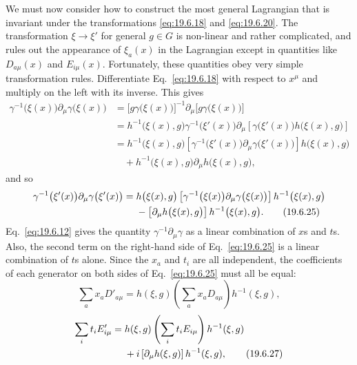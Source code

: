 We must now consider how to construct the most general Lagrangian that is invariant under the transformations \eqref{eq:19.6.18} and \eqref{eq:19.6.20}. The transformation $\xi\to\xi'$ for general $g\in G$ is non-linear and rather complicated, and rules out the appearance of $\xi_a(x)$ in the Lagrangian except in quantities like $D_{a\mu}(x)$ and $E_{i\mu}(x)$. Fortunately, these quantities obey very simple transformation rules. Differentiate Eq.~\eqref{eq:19.6.18} with respect to $x^\mu$ and multiply on the left with its inverse. This gives
\[
\begin{aligned}
\gamma^{-1}\bigl(\xi(x)\bigr)\partial_\mu\gamma\bigl(\xi(x)\bigr)
&=\bigl[g\gamma\bigl(\xi(x)\bigr)\bigr]^{-1}
\partial_\mu\bigl[g\gamma\bigl(\xi(x)\bigr)\bigr]
\\
&=h^{-1}\bigl(\xi(x),g\bigr)
\gamma^{-1}\bigl(\xi'(x)\bigr)
\partial_\mu\left[
\gamma\bigl(\xi'(x)\bigr)h\bigl(\xi(x),g\bigr)\right]
\\
&=h^{-1}\bigl(\xi(x),g\bigr)
\left[
\gamma^{-1}\bigl(\xi'(x)\bigr)
\partial_\mu\gamma\bigl(\xi'(x)\bigr)\right]
h\bigl(\xi(x),g\bigr)
\\
&\quad
+h^{-1}\bigl(\xi(x),g\bigr)
\partial_\mu h\bigl(\xi(x),g\bigr),
\end{aligned}
\]
and so
\begin{align}
\gamma^{-1}\bigl(\xi'(x)\bigr)
\partial_\mu\gamma\bigl(\xi'(x)\bigr)
={}&h\bigl(\xi(x),g\bigr)
\left[
\gamma^{-1}\bigl(\xi(x)\bigr)
\partial_\mu\gamma\bigl(\xi(x)\bigr)\right]
h^{-1}\bigl(\xi(x),g\bigr)
\notag\\
&-\left[
\partial_\mu h\bigl(\xi(x),g\bigr)\right]
h^{-1}\bigl(\xi(x),g\bigr).
\tag{19.6.25}\label{eq:19.6.25}
\end{align}
Eq.~\eqref{eq:19.6.12} gives the quantity $\gamma^{-1}\partial_\mu\gamma$ as a linear combination of $x$s and $t$s. Also, the second term on the right-hand side of Eq.~\eqref{eq:19.6.25} is a linear combination of $t$s alone. Since the $x_a$ and $t_i$ are all independent, the coefficients of each generator on both sides of Eq.~\eqref{eq:19.6.25} must all be equal:
\begin{equation}
\sum_a x_aD'_{a\mu}
=h(\xi,g)\left(\sum_a x_aD_{a\mu}\right)h^{-1}(\xi,g),
\tag{19.6.26}\label{eq:19.6.26}
\end{equation}
\begin{align}
\sum_i t_iE'_{i\mu}
={}&h(\xi,g)\left(\sum_i t_iE_{i\mu}\right)h^{-1}(\xi,g)
\notag\\
&+i\left[\partial_\mu h(\xi,g)\right]h^{-1}(\xi,g),
\tag{19.6.27}\label{eq:19.6.27}
\end{align}
